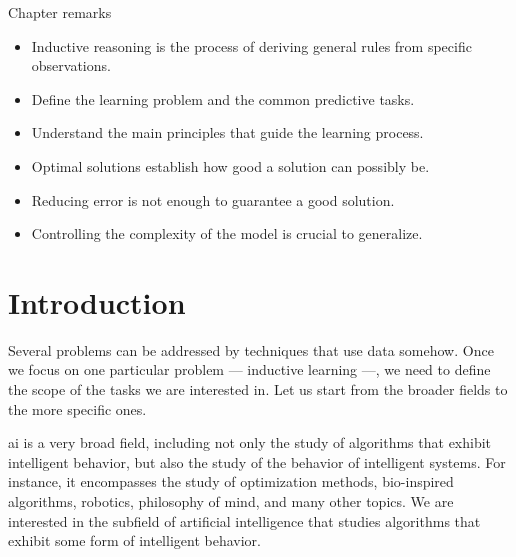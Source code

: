 \begin{mainbox}{Chapter remarks}


  \startcontents[chapters]
  \vspace{1em}


  \begin{itemize}
    \itemsep0em
    \item Inductive reasoning is the process of deriving general rules from specific
      observations.
  \end{itemize}


  \begin{itemize}
    \itemsep0em
    \item Define the learning problem and the common predictive tasks.
    \item Understand the main principles that guide the learning process.
  \end{itemize}


  \begin{itemize}
    \itemsep0em
    \item Optimal solutions establish how good a solution can possibly be.
    \item Reducing error is not enough to guarantee a good solution.
    \item Controlling the complexity of the model is crucial to generalize.
  \end{itemize}
\end{mainbox}

{}
\clearpage

\section{Introduction} %

Several problems can be addressed by techniques that use data somehow.  Once we focus on
one particular problem --- inductive learning ---, we need to define the scope of the
tasks we are interested in.  Let us start from the broader fields to the more specific
ones.

\Gls{ai} is a very broad field, including not only the study of algorithms
that exhibit intelligent behavior, but also the study of the behavior of intelligent
systems.  For instance, it encompasses the study of optimization methods, bio-inspired algorithms,
robotics, philosophy of mind, and many other topics.  We are interested in the subfield of
artificial intelligence that studies algorithms that exhibit some form of intelligent
behavior.

